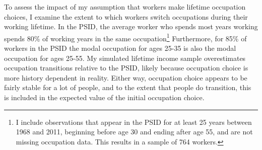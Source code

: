 \documentclass[12pt]{article}
\begin{document}



To assess the impact of my assumption that workers make lifetime occupation choices, I examine the extent to which workers switch occupations during their working lifetime. In the PSID, the average worker who spends most years working spends 80\% of working years in the same occupation\footnote{I include observations that appear in the PSID for at least 25 years between 1968 and 2011, beginning before age 30 and ending after age 55, and are not missing occupation data. This results in a sample of 764 workers.} Furthermore, for 85\% of workers in the PSID the modal occupation for ages 25-35 is also the modal occupation for ages 25-55. My simulated lifetime income sample overestimates occupation transitions relative to the PSID, likely because occupation choice is more history dependent in reality. Either way, occupation choice appears to be fairly stable for a lot of people, and to the extent that people do transition, this is included in the expected value of the initial occupation choice.
\end{document}
